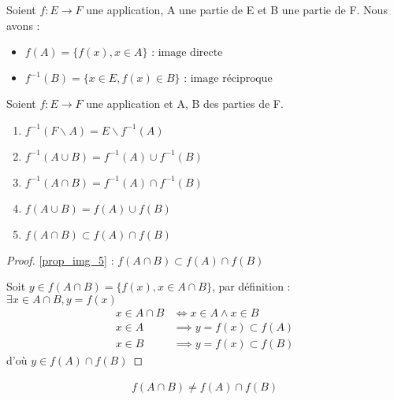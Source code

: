     \begin{definition}
	Soient $f:E \to F$ une application, A une partie de E et B une partie de F. Nous avons :
    \begin{itemize}
        \item $f(A) = \{f(x), x \in A\} \text{ : image directe}$
        \item $f^{-1}(B) = \{x \in E, f(x) \in B\} \text{ : image réciproque}$
    \end{itemize}
\end{definition}


    \begin{proposition}
	Soient $f:E \to F$ une application et A, B des parties de F.
	\begin{enumerate}
        \item \label{prop_img_1} $f^{-1}(F \backslash A) = E \backslash f^{-1}(A)$
        \item \label{prop_img_2} $f^{-1}(A \cup B) = f^{-1}(A) \cup f^{-1}(B)$
        \item \label{prop_img_3} $f^{-1}(A \cap B) = f^{-1}(A) \cap f^{-1}(B)$
        \item \label{prop_img_4} $f(A \cup B) = f(A) \cup f(B)$
        \item \label{prop_img_5} $f(A \cap B) \subset f(A) \cap f(B)$
	\end{enumerate}
\end{proposition}


\begin{proof}
	\ref{prop_img_5} : $f(A \cap B) \subset f(A) \cap f(B)$ \\
	\par \noindent Soit $y \in f(A \cap B) = \{f(x), x \in A \cap B\}$, par définition : $\exists x \in A \cap B, y = f(x)$
	\begin{align*}
		x \in A \cap B &\iff x \in A \wedge x \in B \\
		x \in A &\implies y = f(x) \subset f(A) \\
		x \in B &\implies y = f(x) \subset f(B) 
	\end{align*}
	d'où $y \in f(A) \cap f(B)$
\end{proof} 


\begin{remarque}
	\begin{align*}
		f(A \cap B) \neq f(A) \cap f(B)
	\end{align*}
\end{remarque}

